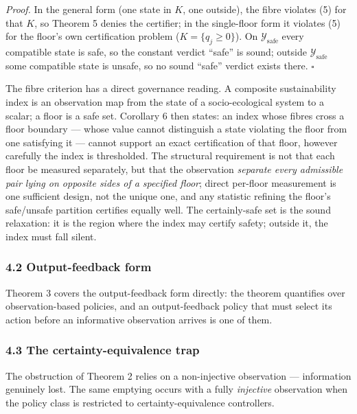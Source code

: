 \documentclass[11pt]{article}
\begin{document}
\emph{Proof.} In the general form (one state in \(K\), one outside), the
fibre violates (5) for that \(K\), so Theorem 5 denies the certifier; in
the single-floor form it violates (5) for the floor's own certification
problem (\(K = \{q_j \ge 0\}\)). On \(\mathcal{Y}_{\mathrm{safe}}\)
every compatible state is safe, so the constant verdict ``safe'' is
sound; outside \(\mathcal{Y}_{\mathrm{safe}}\) some compatible state is
unsafe, so no sound ``safe'' verdict exists there. \ensuremath{\square}

The fibre criterion has a direct governance reading. A composite
sustainability index is an observation map from the state of a
socio-ecological system to a scalar; a floor is a safe set. Corollary 6
then states: an index whose fibres cross a floor boundary --- whose
value cannot distinguish a state violating the floor from one satisfying
it --- cannot support an exact certification of that floor, however
carefully the index is thresholded. The structural requirement is not
that each floor be measured separately, but that the observation
\emph{separate every admissible pair lying on opposite sides of a specified floor}; direct per-floor measurement is one sufficient design,
not the unique one, and any statistic refining the floor's safe/unsafe
partition certifies equally well. The certainly-safe set is the sound relaxation: it is the region where the index may certify safety; outside
it, the index must fall silent.

\subsubsection{4.2 Output-feedback form}\label{output-feedback-form}

Theorem 3 covers the output-feedback form directly: the theorem
quantifies over observation-based policies, and an output-feedback
policy that must select its action before an informative observation
arrives is one of them.

\subsubsection{4.3 The certainty-equivalence
trap}\label{the-certainty-equivalence-trap}

The obstruction of Theorem 2 relies on a non-injective observation ---
information genuinely lost. The same emptying occurs with a fully
\emph{injective} observation when the policy class is restricted to
certainty-equivalence controllers.
\end{document}
